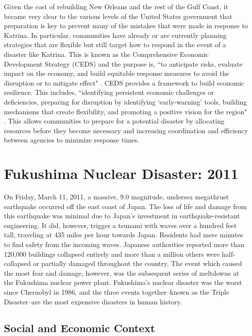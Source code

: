 \documentclass[%
 reprint,
 amsmath,amssymb,
 aps,
]{revtex4-1}
\begin{document}
Given the cost of rebuilding New Orleans and the rest of the Gulf Coast, it became very clear to the various levels of the United States government that preparation is key to prevent many of the mistakes that were made in response to Katrina. In particular, communities have already or are currently planning strategies that are flexible but still target how to respond in the event of a disaster like Katrina. This is known as the Comprehensive Economic Development Strategy (CEDS) and the purpose is, ``to anticipate risks, evaluate impact on the economy, and build equitable response measures to avoid the disruption or to mitigate effect" \cite{meys_franzi_2018}. CEDS provides a framework to build economic resilience. This includes, ``identifying persistent economic challenges or deficiencies, preparing for disruption by identifying `early-warning' tools, building mechanisms that create flexibility, and promoting a positive vision for the region" \cite{meys_franzi_2018}. This allows communities to prepare for a potential disaster by allocating resources before they become necessary and increasing coordination and efficiency between agencies to minimize response times.

\section{\label{sec:level1}Fukushima Nuclear Disaster: 2011}

On Friday, March 11, 2011, a massive, 9.0 magnitude, undersea megathrust earthquake occurred off the east coast of Japan. The loss of life and damage from this earthquake was minimal due to Japan's investment in earthquake-resistant engineering. \cite{ferris_2013} It did, however, trigger a tsunami with waves over a hundred feet tall, traveling at 435 miles per hour towards Japan. Residents had mere minutes to find safety from the incoming waves. \cite{buerk_2011} Japanese authorities reported more than 120,000 buildings collapsed entirely and more than a million others were half-collapsed or partially damaged throughout the country. \cite{npa_2020} The event which caused the most fear and damage, however, was the subsequent series of meltdowns at the Fukushima nuclear power plant. Fukushima's nuclear disaster was the worst since Chernobyl in 1986, and the three events together--known as the Triple Disaster--are the most expensive disasters in human history. \cite{ferris_2013}

\subsection{\label{sec:level2} Social and Economic Context}
\end{document}

